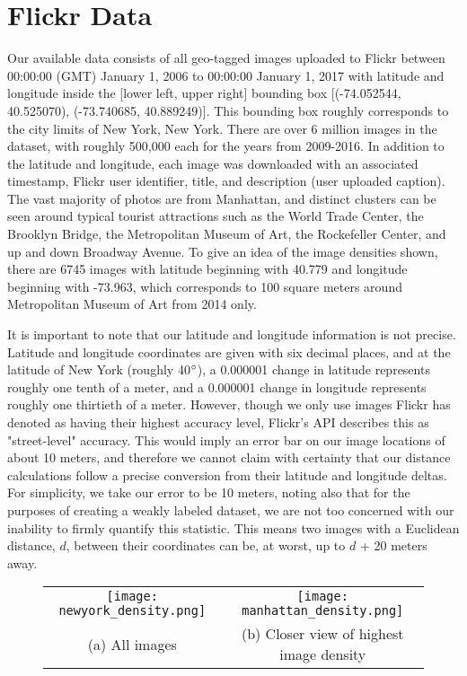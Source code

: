 
\section{Flickr Data}\label{sec:flickr_data}
Our available data consists of all geo-tagged images uploaded to Flickr between 00:00:00 (GMT) January 1, 2006 to 00:00:00 January 1, 2017 with latitude and longitude inside the [lower left, upper right] bounding box [(-74.052544, 40.525070), (-73.740685, 40.889249)]. This bounding box roughly corresponds to the city limits of New York, New York. There are over 6 million images in the dataset, with roughly 500,000 each for the years from 2009-2016. In addition to the latitude and longitude, each image was downloaded with an associated timestamp, Flickr user identifier, title, and description (user uploaded caption). The vast majority of photos are from Manhattan, and distinct clusters can be seen around typical tourist attractions such as the World Trade Center, the Brooklyn Bridge, the Metropolitan Museum of Art, the Rockefeller Center, and up and down Broadway Avenue. To give an idea of the image densities shown, there are 6745 images with latitude beginning with 40.779 and longitude beginning with -73.963, which corresponds to 100 square meters around Metropolitan Museum of Art from 2014 only.

It is important to note that our latitude and longitude information is not precise. Latitude and longitude coordinates are given with six decimal places, and at the latitude of New York (roughly 40$\degree$), a 0.000001 change in latitude represents roughly one tenth of a meter, and a 0.000001 change in longitude represents roughly one thirtieth of a meter. However, though we only use images Flickr has denoted as having their highest accuracy level, Flickr's API describes this as "street-level" accuracy. This would imply an error bar on our image locations of about 10 meters, and therefore we cannot claim with certainty that our distance calculations follow a precise conversion from their latitude and longitude deltas. For simplicity, we take our error to be 10 meters, noting also that for the purposes of creating a weakly labeled dataset, we are not too concerned with our inability to firmly quantify this statistic. This means two images with a Euclidean distance, $d$, between their coordinates can be, at worst, up to $d$ + 20 meters away. 


\begin{figure}[!htbp]
	\centering
	\begin{tabular}{cc}
		  \texttt{[image: newyork\_density.png]} &   \texttt{[image: manhattan\_density.png]} \\
		(a) All images & (b) Closer view of highest image density \\[6pt]
	\end{tabular}
\label{fig:densities}
\end{figure}

